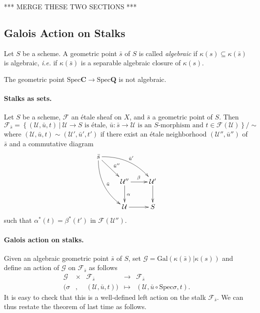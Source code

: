 *** MERGE THESE TWO SECTIONS ***

\subsection{Galois Action on Stalks}
\label{section:GaloisActionOnStalks}

\begin{definition}
Let $S$ be a scheme. A geometric point $\bar s$ of $S$ is called \emph{algebraic} if $\kappa(s) \subseteq \kappa(\bar s)$ is algebraic, {\it i.e.} if $\kappa(\bar s)$ is a separable algebraic closure of $\kappa(s)$.
\end{definition}

\begin{example}
The geometric point $\text{Spec} \mathbf{C} \to \text{Spec} \mathbf{Q}$ is not algebraic.
\end{example}

\paragraph{Stalks as sets.}
Let $S$ be a scheme, $\mathcal{F}$ an \'etale sheaf on $X$, and $\bar s$ a geometric point of $S$. Then 
$$
\mathcal{F}_{\bar s} = \left\{
(\mathcal{U},\bar u, t) \ \big| \ \mathcal{U} \to S \text{ is \'etale, } \bar u : \bar s \to \mathcal{U} \text{ is an $S$-morphism and } t \in \mathcal{F}(\mathcal{U})
\right\}
\big/\sim
$$
where $(\mathcal{U},\bar u, t) \sim (\mathcal{U}',\bar u', t')$ if there exist an \'etale neighborhood $(\mathcal{U}'',\bar u'')$ of $\bar s$ and a commutative diagram
$$
\xymatrix{
\bar s \ar^{\bar u''}[rd] \ar^{\bar u'}@/^1pc/[rrd] \ar^{\bar u}@/_1pc/[rdd] \\
& \mathcal{U}'' \ar^{\beta}[r] \ar^{\alpha}[d] & \mathcal{U}' \ar[d] \\
& \mathcal{U} \ar[r] & S
}
$$
such that $\alpha^*(t) = \beta^*(t')$ in $\mathcal{F}(\mathcal{U}'')$.

\paragraph{Galois action on stalks.}
Given an algebraic geometric point $\bar s$ of $S$, set $\mathcal{G} = \text{Gal}(\kappa(\bar s) | \kappa(s))$ and define an action of $\mathcal{G}$ on $\mathcal{F}_{\bar s}$ as follows
$$
\begin{array}{ccccl}
\mathcal{G} & \times & \mathcal{F}_{\bar s} & \longrightarrow & \mathcal{F}_{\bar s} \\
(\sigma & , & (\mathcal{U},\bar u, t)) & \longmapsto & (\mathcal{U},\bar u \circ \text{Spec} \sigma, t).
\end{array}
$$
It is easy to check that this is a well-defined left action on the stalk $\mathcal{F}_{\bar s}$. We can thus restate the theorem of last time as follows.

